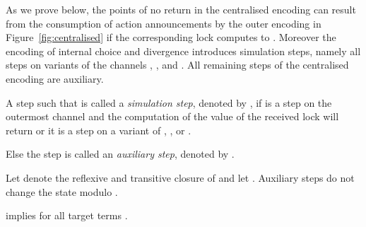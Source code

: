 \documentclass[]{eptcs}
\begin{document}
As we prove below, the points of no return in the centralised encoding can result from the consumption of action announcements by the outer encoding in Figure~\ref{fig:centralised} if the corresponding lock computes to . Moreover the encoding of internal choice and divergence introduces simulation steps, namely all steps on variants of the channels , , and . All remaining steps of the centralised encoding are auxiliary.

\begin{definition}
	A step  such that  is called a \emph{simulation step}, denoted by , if  is a step on the outermost channel  and the computation of the value of the received lock  will return  or it is a step on a variant of , , or .
	
	Else the step  is called an \emph{auxiliary step}, denoted by .
	\label{def:auxStepsCentral}
\end{definition}

\noindent
Let  denote the reflexive and transitive closure of  and let .
Auxiliary steps do not change the state modulo .

\begin{lemma}
	 implies  for all target terms .
	\label{lem:auxStepsCentral}
\end{lemma}
\end{document}
